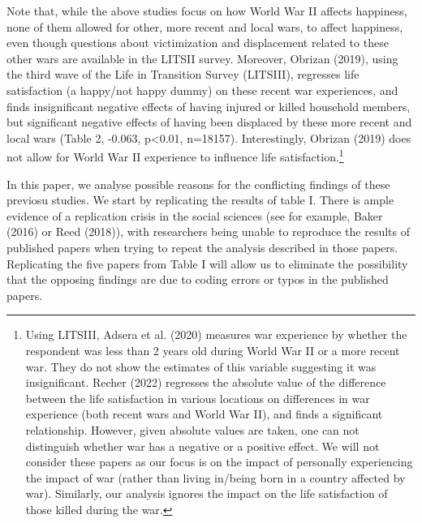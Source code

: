 \documentclass[
  letterpaper,
  DIV=11,
  numbers=noendperiod]{scrartcl}
\begin{document}
Note that, while the above studies focus on how World War II affects
happiness, none of them allowed for other, more recent and local wars,
to affect happiness, even though questions about victimization and
displacement related to these other wars are available in the LITSII
survey. Moreover, Obrizan (2019), using the third wave of the Life in
Transition Survey (LITSIII), regresses life satisfaction (a happy/not
happy dummy) on these recent war experiences, and finds insignificant
negative effects of having injured or killed household members, but
significant negative effects of having been displaced by these more
recent and local wars (Table 2, -0.063, p\textless0.01, n=18157).
Interestingly, Obrizan (2019) does not allow for World War II experience
to influence life satisfaction.\footnote{Using LITSIII, Adsera et al.
  (2020) measures war experience by whether the respondent was less than
  2 years old during World War II or a more recent war. They do not show
  the estimates of this variable suggesting it was insignificant. Recher
  (2022) regresses the absolute value of the difference between the life
  satisfaction in various locations on differences in war experience
  (both recent wars and World War II), and finds a significant
  relationship. However, given absolute values are taken, one can not
  distinguish whether war has a negative or a positive effect. We will
  not consider these papers as our focus is on the impact of personally
  experiencing the impact of war (rather than living in/being born in a
  country affected by war). Similarly, our analysis ignores the impact
  on the life satisfaction of those killed during the war.}

In this paper, we analyse possible reasons for the conflicting findings
of these previosu studies. We start by replicating the results of table
I. There is ample evidence of a replication crisis in the social
sciences (see for example, Baker (2016) or Reed (2018)), with
researchers being unable to reproduce the results of published papers
when trying to repeat the analysis described in those papers.
Replicating the five papers from Table I will allow us to eliminate the
possibility that the opposing findings are due to coding errors or typos
in the published papers.
\end{document}
